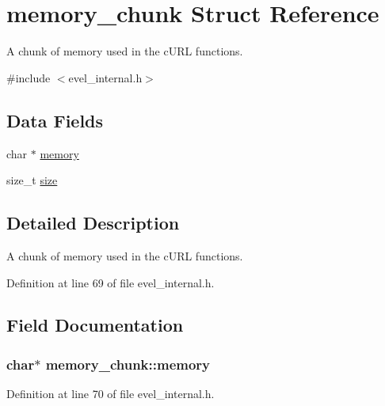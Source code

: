 \hypertarget{structmemory__chunk}{}\section{memory\+\_\+chunk Struct Reference}
\label{structmemory__chunk}


A chunk of memory used in the c\+U\+R\+L functions.  




{\ttfamily \#include $<$evel\+\_\+internal.\+h$>$}

\subsection*{Data Fields}
\begin{DoxyCompactItemize}
\item 
char $\ast$ \hyperlink{structmemory__chunk_aa0c25575887b3d8a2117f1fbb2c7c335}{memory}
\item 
size\+\_\+t \hyperlink{structmemory__chunk_abf98e30fa06d9af77beb446660be9c27}{size}
\end{DoxyCompactItemize}


\subsection{Detailed Description}
A chunk of memory used in the c\+U\+R\+L functions. 

Definition at line 69 of file evel\+\_\+internal.\+h.



\subsection{Field Documentation}
\hypertarget{structmemory__chunk_aa0c25575887b3d8a2117f1fbb2c7c335}{}
\subsubsection[{memory}]{\setlength{\rightskip}{0pt plus 5cm}char$\ast$ memory\+\_\+chunk\+::memory}\label{structmemory__chunk_aa0c25575887b3d8a2117f1fbb2c7c335}


Definition at line 70 of file evel\+\_\+internal.\+h.

\hypertarget{structmemory__chunk_abf98e30fa06d9af77beb446660be9c27}{}
